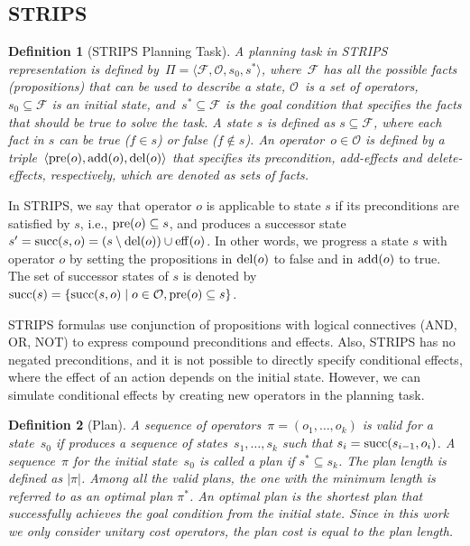 \documentclass[ppgc,diss,english]{iiufrgs}
\newtheorem{definition}{Definition}
\begin{document}
\subsection{STRIPS}
\label{sec:background-strips}

\begin{definition}[STRIPS Planning Task]\label{def:strips}
A planning task in STRIPS representation is defined by~$\Pi=\langle\mathcal{F},\mathcal{O},s_{0},s^{*}\rangle$, where~$\mathcal{F}$ has all the possible facts (propositions) that can be used to describe a state, $\mathcal{O}$~is a set of operators,~$s_{0} \subseteq \mathcal{F}$ is an initial state, and~$s^{*} \subseteq \mathcal{F}$ is the goal condition that specifies the facts that should be true to solve the task.
A state $s$ is defined as $s \subseteq \mathcal{F}$, where each fact in $s$ can be true ($f \in s$) or false ($f \notin s$). %
An operator~$o \in \mathcal{O}$ is defined by a triple~$\langle\operatorname{pre}(o),\operatorname{add}(o),\operatorname{del}(o)\rangle$ that specifies its precondition, add-effects and delete-effects, respectively, which are denoted as sets of facts.
\end{definition}

In STRIPS, we say that operator $o$ is applicable to state $s$ if its preconditions are satisfied by $s$, i.e., $\operatorname{pre}(o) \subseteq s$, and produces a successor state~$s' = \operatorname{succ}(s,o) = (s \setminus \operatorname{del}(o)) \cup \operatorname{eff}(o)$. In other words, we progress a state $s$ with operator $o$ by setting the propositions in $\operatorname{del}(o)$ to false and in $\operatorname{add}(o)$ to true. The set of successor states of $s$ is denoted by~$\operatorname{succ}(s)=\{\operatorname{succ}(s,o)\mid o\in \mathcal{O}, \operatorname{pre}(o) \subseteq s\}$.

STRIPS formulas use conjunction of propositions with logical connectives (AND, OR, NOT) to express compound preconditions and effects. Also, STRIPS has no negated preconditions, and it is not possible to directly specify conditional effects, where the effect of an action depends on the initial state. However, we can simulate conditional effects by creating new operators in the planning task.

\begin{definition}[Plan]\label{def:plan}
A sequence of operators~$\pi=(o_1,\ldots,o_k)$ is valid for a state~$s_0$ if produces a sequence of states~$s_1,\ldots,s_k$ such that $s_i=\operatorname{succ}(s_{i-1},o_i)$. A sequence~$\pi$ for the initial state~$s_{0}$ is called a plan if $s^{*} \subseteq s_{k}$. The plan length is defined as $|\pi|$. Among all the valid plans, the one with the minimum length is referred to as an optimal plan $\pi^{*}$. An optimal plan is the shortest plan that successfully achieves the goal condition from the initial state. Since in this work we only consider unitary cost operators, the plan cost is equal to the plan length.
\end{definition}
\end{document}
